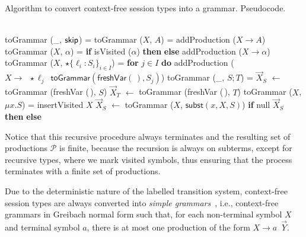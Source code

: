 \begin{algorithm}
\caption{Algorithm to convert context-free session types into a grammar. Pseudocode.}
\label{alg:toGrammar}
\begin{algorithmic}
\\
\State \textsf{toGrammar} (\_, $\mathsf{skip}$) = 
\State \qquad \Return{$\varepsilon$}\smallskip
\State \textsf{toGrammar} ($X$, $A$) = 
\State \qquad \textsf{addProduction} ($X \rightarrow A$)
\State \qquad {}\smallskip
\State \textsf{toGrammar} ($X$, $\alpha$) = 
\State \qquad\textbf{if} \textsf{isVisited} ($\alpha$) \textbf {then}
\State \qquad\qquad \Return{$\alpha$}
\State \qquad\textbf{else}
\State \qquad\qquad \textsf{addProduction} ($X \rightarrow \alpha$)
\State \qquad\qquad {}\smallskip
\State \textsf{toGrammar} ($X$, $\star \{\ell_i : S_i \}_{i\in I}$) =  
\State \qquad \textbf{for} {$j\in I$} \textbf{do} 
\State \qquad \qquad \textsf{addProduction} ($X \rightarrow \enspace \star \ell_j \enspace \mathsf{toGrammar}(\mathsf{freshVar}(\,), S_j)$)
\State \qquad {}\smallskip
\State \textsf{toGrammar} (\_, $S;T$) =
\State \qquad $\vec X_S$ $\gets$ \textsf{toGrammar} (\textsf{freshVar} (\,), $S$)
\State \qquad $\vec X_T$ $\gets$ \textsf{toGrammar} (\textsf{freshVar} (\,), $T$)
\State \qquad {}\smallskip
\State \textsf{toGrammar} ($X$, $\mu x.S$) =
\State \qquad \textsf{insertVisited} $X$\smallskip
\State \qquad $\vec X_S$ $\gets$ \textsf{toGrammar} ($X$, $\mathsf{subst}(x,X,S)$)
\State \qquad \textbf{if} \textsf{null} $\vec X_S$ \textbf{then} 
\State \qquad \qquad \Return{$\varepsilon$}
\State \qquad \textbf{else} 
\State \qquad \qquad {}\smallskip
\end{algorithmic}
\end{algorithm}



Notice that this recursive procedure always terminates and the resulting 
set of productions $\mathcal{P}$ is finite, because the recursion is always 
on subterms, except for recursive types, where we mark visited symbols, thus 
ensuring that the process terminates with a finite set of productions.

Due to the deterministic nature of the labelled transition system, context-free 
session types are always converted into \emph{simple grammars}~\cite{baeten1993decidability}, i.e., 
context-free grammars in Greibach normal form such that, for each non-terminal 
symbol $X$ and terminal symbol $a$, there is at most one production of the form 
$X\rightarrow a \enspace \vec Y$.

